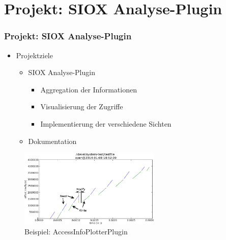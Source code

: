 \section{Projekt: SIOX Analyse-Plugin}
\begin{frame}
	\frametitle{Projekt: SIOX Analyse-Plugin}
	\begin{itemize}
		\item Projektziele
			\begin{itemize}
				\item SIOX Analyse-Plugin
					\begin{itemize}
						\item Aggregation der Informationen
						\item Visualisierung der Zugriffe
						\item Implementierung der verschiedene Sichten
					\end{itemize}
				\item Dokumentation
			\end{itemize}
	\end{itemize}
	\centering
	\begin{figure}
		\includegraphics[width=0.6\textwidth]{pictures/p1.png}
		\caption*{Beispiel: AccessInfoPlotterPlugin}
	\end{figure}
\end{frame}

